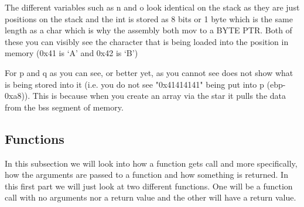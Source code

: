 \documentclass{report}
\begin{document}
The different variables such as n and o look identical on the stack as they are just positions on the stack and the int is stored as 8 bits or 1 byte which is the same length as a char which is why the assembly both mov to a BYTE PTR.  Both of these you can visibly see the character that is being loaded into the position in memory (0x41 is `A' and 0x42 is `B')

For p and q as you can see, or better yet, as you cannot see does not show what is being stored into it (i.e. you do not see "0x41414141" being put into p (ebp-0xa8)).  This is because when you create an array via the star it pulls the data from the bss segment of memory.

\subsection{Functions}
In this subsection we will look into how a function gets call and more specifically, how the arguments are passed to a function and how something is returned.  In this first part we will just look at two different functions.  One will be a function call with no arguments nor a return value and the other will have a return value.
\end{document}

